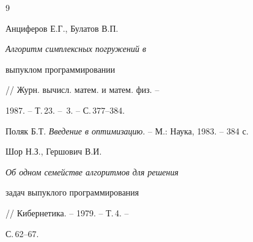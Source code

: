 \begin{thebibliography}{9}







Анциферов Е.Г., Булатов В.П. {\em Алгоритм симплексных погружений в


выпуклом программировании} // Журн. вычисл. матем. и матем. физ. --


1987. -- Т.\,23. -- \No\,3. -- С.\,377--384.




Поляк Б.Т. {\em Введение в оптимизацию}. -- М.: Наука, 1983. -- 384 с.




Шор Н.З., Гершович В.И. {\em Об одном семействе алгоритмов для решения


задач выпуклого программирования} // Кибернетика. -- 1979. -- Т.\,4. --


С.\,62--67.





\end{thebibliography}





\vskip 2cm

















